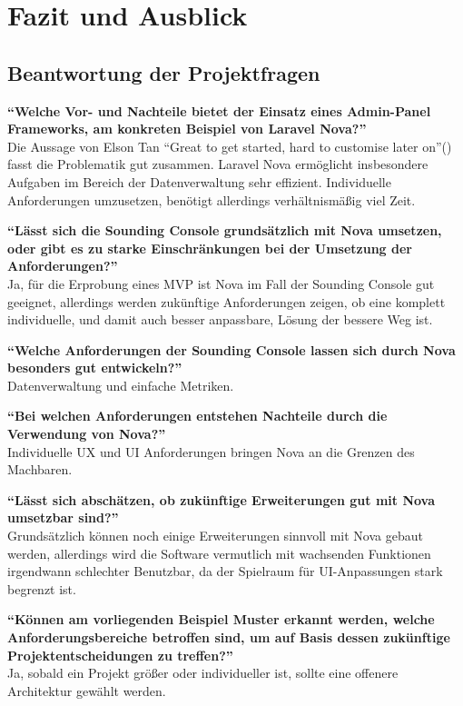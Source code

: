 \section{Fazit und Ausblick}

\subsection{Beantwortung der Projektfragen}

\textbf{\enquote{Welche Vor- und Nachteile bietet der Einsatz eines Admin-Panel Frameworks, am konkreten Beispiel von Laravel Nova?}}\\
Die Aussage von Elson Tan \enquote{Great to get started, hard to customise later on}(\cite{laravel-nova-in-production-one-year-later}) fasst die Problematik gut zusammen.
Laravel Nova ermöglicht insbesondere Aufgaben im Bereich der Datenverwaltung sehr effizient.
Individuelle Anforderungen umzusetzen, benötigt allerdings verhältnismäßig viel Zeit.

\textbf{\enquote{Lässt sich die Sounding Console grundsätzlich mit Nova umsetzen, oder gibt es zu starke Einschränkungen bei der Umsetzung der Anforderungen?}}\\
Ja, für die Erprobung eines MVP ist Nova im Fall der Sounding Console gut geeignet, allerdings werden zukünftige Anforderungen zeigen, ob eine komplett individuelle, und damit auch besser anpassbare, Lösung der bessere Weg ist.

\textbf{\enquote{Welche Anforderungen der Sounding Console lassen sich durch Nova besonders gut entwickeln?}}\\
Datenverwaltung und einfache Metriken.

\textbf{\enquote{Bei welchen Anforderungen entstehen Nachteile durch die Verwendung von Nova?}}\\
Individuelle UX und UI Anforderungen bringen Nova an die Grenzen des Machbaren.

\textbf{\enquote{Lässt sich abschätzen, ob zukünftige Erweiterungen gut mit Nova umsetzbar sind?}}\\
Grundsätzlich können noch einige Erweiterungen sinnvoll mit Nova gebaut werden, allerdings wird die Software vermutlich mit wachsenden Funktionen irgendwann schlechter Benutzbar, da der Spielraum für UI-Anpassungen stark begrenzt ist.

\textbf{\enquote{Können am vorliegenden Beispiel Muster erkannt werden, welche Anforderungsbereiche betroffen sind, um auf Basis dessen zukünftige Projektentscheidungen zu treffen?}}\\
Ja, sobald ein Projekt größer oder individueller ist, sollte eine offenere Architektur gewählt werden.

